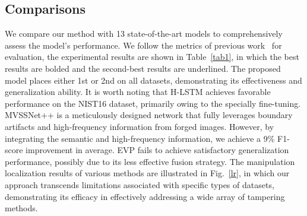 \documentclass{article}
\begin{document}
\subsection{Comparisons}
We compare our method with 13 state-of-the-art models to comprehensively assess the model's performance. We follow the metrics of previous work~\cite{PIM} for evaluation, the experimental results are shown in Table~\ref{tab1}, in which the best results are bolded and the second-best results are underlined. 
The proposed model places either 1st or 2nd on all datasets, demonstrating its effectiveness and generalization ability.
It is worth noting that H-LSTM achieves favorable performance on the NIST16 dataset, primarily owing to the specially fine-tuning. 
MVSSNet++ is a meticulously designed network that fully leverages boundary artifacts and high-frequency information from forged images. However, by integrating the semantic and high-frequency information, we achieve a 9\% F1-score improvement in average. 
EVP fails to achieve satisfactory generalization performance, possibly due to its less effective fusion strategy. 
The manipulation localization results of various methods are illustrated in Fig.~\ref {lr}, in which our approach transcends limitations associated with specific types of datasets, demonstrating its efficacy in effectively addressing a wide array of tampering methods.


\begin{table}[!t]
\small
\begin{center}
\caption{Image Manipulation Localization Performance(F1 score with fixed threshold: 0.5)} \label{tab2}
\end{center}
\end{table}
\end{document}
